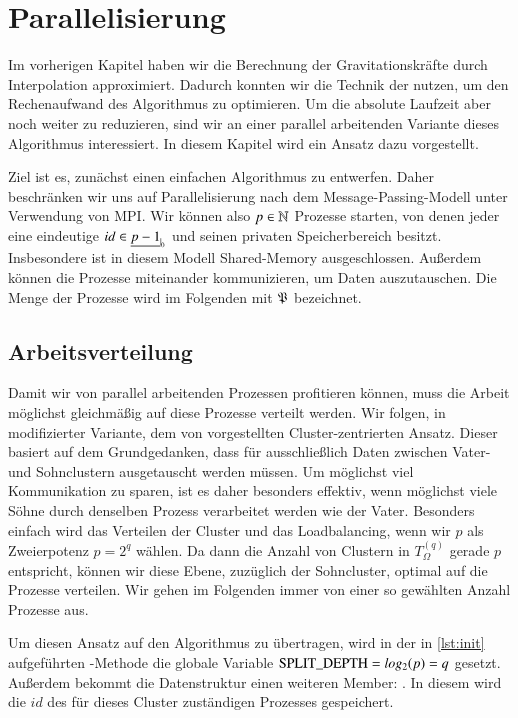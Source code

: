 \section{Parallelisierung}
\label{sec:parallelpart}
  Im vorherigen Kapitel haben wir die Berechnung der Gravitationskräfte durch Interpolation approximiert. Dadurch konnten wir die Technik der \hquad nutzen, um den Rechenaufwand des Algorithmus zu 
  optimieren.
  Um die absolute Laufzeit aber noch weiter zu reduzieren, sind wir an einer parallel arbeitenden Variante dieses Algorithmus interessiert. In diesem Kapitel wird ein Ansatz dazu vorgestellt.
  
  Ziel ist es, zunächst einen einfachen Algorithmus zu entwerfen. Daher beschränken wir uns auf Parallelisierung nach dem Message-Passing-Modell unter Verwendung von MPI. Wir können also 
  $p \in \mathbb{N}$ Prozesse starten, von denen jeder eine eindeutige $id \in \nullhaken{p-1}$ und seinen privaten Speicherbereich besitzt. Insbesondere ist in diesem Modell Shared-Memory ausgeschlossen. 
  Außerdem können die Prozesse miteinander kommunizieren, um Daten auszutauschen. Die Menge der Prozesse wird im Folgenden mit $\mathfrak{P}$ bezeichnet.

  
  \subsection{Arbeitsverteilung}
  \label{sec:work}
    Damit wir von parallel arbeitenden Prozessen profitieren können, muss die Arbeit möglichst gleichmäßig auf diese Prozesse verteilt werden. Wir folgen, in modifizierter Variante, dem von 
    \citet{distrh2} vorgestellten Cluster-zentrierten Ansatz. 
    Dieser basiert auf dem Grundgedanken, dass für \vorruck ausschließlich Daten zwischen Vater- und Sohnclustern ausgetauscht werden müssen. Um möglichst viel Kommunikation zu sparen, ist es daher
    besonders effektiv, wenn möglichst viele Söhne durch denselben Prozess verarbeitet werden wie der Vater. Besonders einfach wird das Verteilen der Cluster und das Loadbalancing, wenn wir $p$ als 
    Zweierpotenz $p = 2^q$ wählen. Da dann die Anzahl von Clustern in $T_\Omega^{(q)}$ gerade $p$ entspricht, können wir diese Ebene, zuzüglich der Sohncluster, optimal auf die Prozesse verteilen.
    Wir gehen im Folgenden immer von einer so gewählten Anzahl Prozesse aus.
    
    Um diesen Ansatz auf den Algorithmus zu übertragen, wird in der in \autoref{lst:init} aufgeführten -Methode die globale Variable $\tcode{SPLIT_DEPTH} = log_2(p) = q$ gesetzt. 
    Außerdem bekommt die Datenstruktur  einen weiteren Member: . In diesem  wird die $id$ des für dieses Cluster zuständigen Prozesses gespeichert.
    
